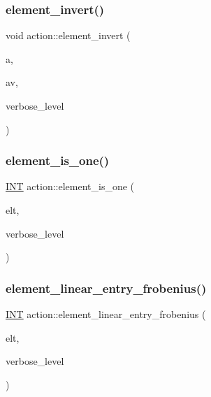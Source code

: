\subsubsection{\texorpdfstring{element\+\_\+invert()}{element\_invert()}}
{\footnotesize\ttfamily void action\+::element\+\_\+invert (\begin{DoxyParamCaption}\item[{void $\ast$}]{a,  }\item[{void $\ast$}]{av,  }\item[{\mbox{\hyperlink{galois_8h_a09fddde158a3a20bd2dcadb609de11dc}{I\+NT}}}]{verbose\+\_\+level }\end{DoxyParamCaption})}

\mbox{\label{classaction_aeb623ab323a151f64d713288cd13224d}} 
\subsubsection{\texorpdfstring{element\+\_\+is\+\_\+one()}{element\_is\_one()}}
{\footnotesize\ttfamily \mbox{\hyperlink{galois_8h_a09fddde158a3a20bd2dcadb609de11dc}{I\+NT}} action\+::element\+\_\+is\+\_\+one (\begin{DoxyParamCaption}\item[{void $\ast$}]{elt,  }\item[{\mbox{\hyperlink{galois_8h_a09fddde158a3a20bd2dcadb609de11dc}{I\+NT}}}]{verbose\+\_\+level }\end{DoxyParamCaption})}

\mbox{\label{classaction_a16389ca18dabdd595eb81fce743f55fa}} 
\subsubsection{\texorpdfstring{element\+\_\+linear\+\_\+entry\+\_\+frobenius()}{element\_linear\_entry\_frobenius()}}
{\footnotesize\ttfamily \mbox{\hyperlink{galois_8h_a09fddde158a3a20bd2dcadb609de11dc}{I\+NT}} action\+::element\+\_\+linear\+\_\+entry\+\_\+frobenius (\begin{DoxyParamCaption}\item[{void $\ast$}]{elt,  }\item[{\mbox{\hyperlink{galois_8h_a09fddde158a3a20bd2dcadb609de11dc}{I\+NT}}}]{verbose\+\_\+level }\end{DoxyParamCaption})}

